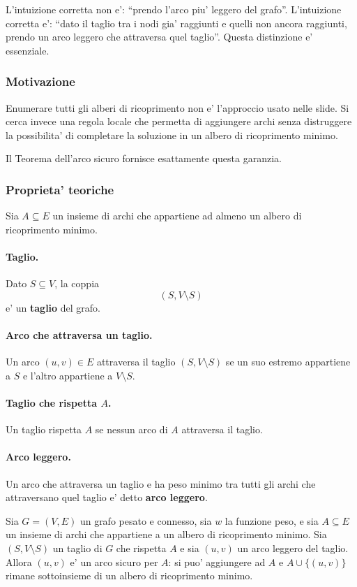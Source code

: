 L'intuizione corretta non e': ``prendo l'arco piu' leggero del grafo''. L'intuizione corretta e': ``dato il taglio tra i nodi gia' raggiunti e quelli non ancora raggiunti, prendo un arco leggero che attraversa quel taglio''. Questa distinzione e' essenziale.

\subsubsection{Motivazione}
Enumerare tutti gli alberi di ricoprimento non e' l'approccio usato nelle slide. Si cerca invece una regola locale che permetta di aggiungere archi senza distruggere la possibilita' di completare la soluzione in un albero di ricoprimento minimo.

Il Teorema dell'arco sicuro fornisce esattamente questa garanzia.

\subsubsection{Proprieta' teoriche}
Sia $A\subseteq E$ un insieme di archi che appartiene ad almeno un albero di ricoprimento minimo.

\paragraph{Taglio.}
Dato $S\subseteq V$, la coppia
\[
(S,V\setminus S)
\]
e' un \textbf{taglio} del grafo.

\paragraph{Arco che attraversa un taglio.}
Un arco $(u,v)\in E$ attraversa il taglio $(S,V\setminus S)$ se un suo estremo appartiene a $S$ e l'altro appartiene a $V\setminus S$.

\paragraph{Taglio che rispetta $A$.}
Un taglio rispetta $A$ se nessun arco di $A$ attraversa il taglio.

\paragraph{Arco leggero.}
Un arco che attraversa un taglio e ha peso minimo tra tutti gli archi che attraversano quel taglio e' detto \textbf{arco leggero}.

\begin{teorema}
Sia $G=(V,E)$ un grafo pesato e connesso, sia $w$ la funzione peso, e sia $A\subseteq E$ un insieme di archi che appartiene a un albero di ricoprimento minimo.
Sia $(S,V\setminus S)$ un taglio di $G$ che rispetta $A$ e sia $(u,v)$ un arco leggero del taglio. Allora $(u,v)$ e' un arco sicuro per $A$: si puo' aggiungere ad $A$ e $A\cup\{(u,v)\}$ rimane sottoinsieme di un albero di ricoprimento minimo.
\end{teorema}

